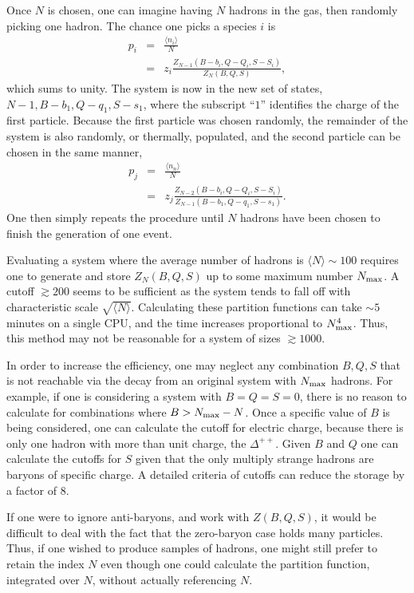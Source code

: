 \documentclass[letterpaper,aps,showpacs,floatfix,10pt,prc]{revtex4-1}
\begin{document}
Once $N$ is chosen, one can imagine having $N$ hadrons in the gas, then randomly picking one hadron. The chance one picks a species $i$ is
\begin{eqnarray}
p_i&=&\frac{\langle n_i\rangle}{N}\\
\nonumber
&=&z_i\frac{Z_{N-1}(B-b_i,Q-Q_i,S-S_i)}{Z_N(B,Q,S)},
\end{eqnarray}
which sums to unity. The system is now in the new set of states, $N-1,B-b_1,Q-q_1,S-s_1$, where the subscript ``$1$'' identifies the charge of the first particle. Because the first particle was chosen randomly, the remainder of the system is also randomly, or thermally, populated, and the second particle can be chosen in the same manner,
\begin{eqnarray}
p_j&=&\frac{\langle n_n\rangle}{N}\\
\nonumber
&=&z_j\frac{Z_{N-2}(B-b_i,Q-Q_i,S-S_i)}{Z_{N-1}(B-b_1,Q-q_1,S-s_1)}.
\end{eqnarray}
One then simply repeats the procedure until $N$ hadrons have been chosen to finish the generation of one event. 

Evaluating a system where the average number of hadrons is $\langle N\rangle\sim 100$ requires one to generate and store $Z_N(B,Q,S)$ up to some maximum number $N_{\rm max}$. A cutoff $\gtrsim 200$ seems to be sufficient as the system tends to fall off with characteristic scale $\sqrt{\langle N\rangle}$. Calculating these partition functions can take $\sim 5$ minutes on a single CPU, and the time increases proportional to $N_{\rm max}^4$. Thus, this method may not be reasonable for a system of sizes $\gtrsim 1000$. 

In order to increase the efficiency, one may neglect any combination $B,Q,S$ that is not reachable via the decay from an original system with $N_{\rm max}$ hadrons. For example, if one is considering a system with $B=Q=S=0$, there is no reason to calculate for combinations where $B>N_{\rm max}-N$. Once a specific value of $B$ is being considered, one can calculate the cutoff for electric charge, because there is only one hadron with more than unit charge, the $\Delta^{++}$. Given $B$ and $Q$ one can calculate the cutoffs for $S$ given that the only multiply strange hadrons are baryons of specific charge. A detailed criteria of cutoffs can reduce the storage by a factor of 8.

If one were to ignore anti-baryons, and work with $Z(B,Q,S)$, it would be difficult to deal with the fact that the zero-baryon case holds many particles. Thus, if one wished to produce samples of hadrons, one might still prefer to retain the index $N$ even though one could calculate the partition function, integrated over $N$, without actually referencing $N$.
\end{document}
